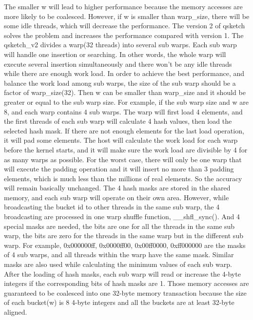 \documentclass[conference]{IEEEtran}
\begin{document}
The smaller w will lead to higher performance because the memory accesses are more likely to be coalesced. However, if w is smaller than warp\_size, there will be some idle threads, which will decrease the performance. The version 2 of qsketch solves the problem and increases the performance compared with version 1. The qsketch\_v2 divides a warp(32 threads) into several sub warps. Each sub warp will handle one insertion or searching. In other words, the whole warp will execute several insertion simultaneously and there won’t be any idle threads while there are enough work load. 
In order to achieve the best performance, and balance the work load among sub warps, the size of the sub warp should be a factor of warp\_size(32). Then w can be smaller than warp\_size and it should be greater or equal to the sub warp size.
For example, if the sub warp size and w are 8, and each warp contains 4 sub warps. The warp will first load 4 elements, and the first threads of each sub warp will calculate 4 hash values, then load the selected hash mask. If there are not enough elements for the last load operation, it will pad some elements. The host will calculate the work load for each warp before the kernel starts, and it will make sure the work load are divisible by 4 for as many warps as possible. For the worst case, there will only be one warp that will execute the padding operation and it will insert no more than 3 padding elements, which is much less than the millions of real elements. So the accuracy will remain basically unchanged. The 4 hash masks are stored in the shared memory, and each sub warp will operate on their own area. However, while broadcasting the bucket id to other threads in the same sub warp, the 4 broadcasting are processed in one warp shuffle function, \_\_shfl\_sync(). And 4 special masks are needed, the bits are one for all the threads in the same sub warp, the bits are zero for the threads in the same warp but in the different sub warp. For example, 0x000000ff, 0x0000ff00, 0x00ff0000, 0xff000000 are the masks of 4 sub warps, and all threads within the warp have the same mask. Similar masks are also used while calculating the minimum values of each sub warp. After the loading of hash masks, each sub warp will read or increase the 4-byte integers if the corresponding bits of hash masks are 1. Those memory accesses are guaranteed to be coalesced into one 32-byte memory transaction because the size of each bucket(w) is 8 4-byte integers and all the buckets are at least 32-byte aligned.


\end{document}
